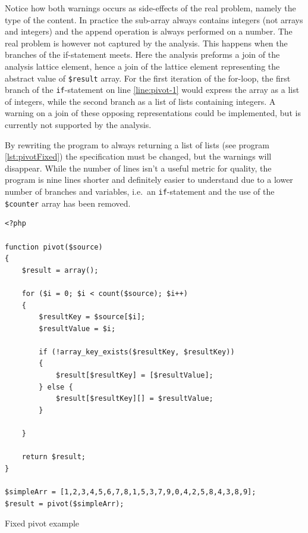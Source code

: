 Notice how both warnings occurs as side-effects of the real problem, namely the type of the content. In practice the sub-array always contains integers (not arrays and integers) and the append operation is always performed on a number. The real problem is however not captured by the analysis. This happens when the branches of the if-statement meets. Here the analysis preforms a join of the analysis lattice element, hence a join of the lattice element representing the abstract value of \texttt{\$result} array. For the first iteration of the for-loop, the first branch of the \texttt{if}-statement on line \ref{line:pivot-1} would express the array as a list of integers, while the second branch as a list of lists containing integers. A warning on a join of these opposing representations could be implemented, but is currently not supported by the analysis.

By rewriting the program to always returning a list of lists (see program \ref{lst:pivotFixed}) the specification must be changed, but the warnings will disappear. While the number of lines isn't a useful metric for quality, the program is nine lines shorter and definitely easier to understand due to a lower number of branches and variables, i.e.\ an \texttt{if}-statement and the use of the \texttt{\$counter} array has been removed.

\begin{program}
\begin{lstlisting}
<?php

function pivot($source)
{
    $result = array();

    for ($i = 0; $i < count($source); $i++)
    {
        $resultKey = $source[$i];
        $resultValue = $i;

        if (!array_key_exists($resultKey, $resultKey))
        {
            $result[$resultKey] = [$resultValue];
        } else {
            $result[$resultKey][] = $resultValue;
        }

    }

    return $result;
}

$simpleArr = [1,2,3,4,5,6,7,8,1,5,3,7,9,0,4,2,5,8,4,3,8,9];
$result = pivot($simpleArr);
\end{lstlisting}
\caption{Fixed pivot example}
\label{lst:pivotFixed}
\end{program}

